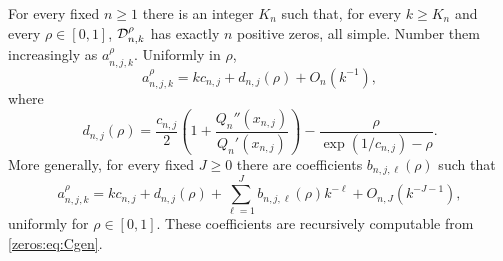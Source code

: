 \begin{theorem}\label{zeros:thm:zeroasympt}
For every fixed $n\geq1$ there is an integer $K_n$ such that, for every $k\geq K_n$ and every $\rho\in[0,1]$, $\mathcal D_{n,k}^{\rho}$ has exactly $n$ positive zeros, all simple. Number them increasingly as $a_{n,j,k}^{\rho}$. Uniformly in $\rho$,
\begin{equation}\label{zeros:eq:zero2}
 a_{n,j,k}^{\rho}=kc_{n,j}+d_{n,j}(\rho)+O_n(k^{-1}),
\end{equation}
where
\begin{equation}\label{zeros:eq:offset}
 d_{n,j}(\rho)=\frac{c_{n,j}}2
   \left(1+\frac{Q_n''(x_{n,j})}{Q_n'(x_{n,j})}\right)
       -\frac{\rho}{\exp(1/c_{n,j})-\rho}.
\end{equation}
More generally, for every fixed $J\geq0$ there are coefficients $b_{n,j,\ell}(\rho)$ such that
\begin{equation}\label{zeros:eq:zeroall}
 a_{n,j,k}^{\rho}=kc_{n,j}+d_{n,j}(\rho)
   +\sum_{\ell=1}^J b_{n,j,\ell}(\rho)k^{-\ell}
   +O_{n,J}(k^{-J-1}),
\end{equation}
uniformly for $\rho\in[0,1]$. These coefficients are recursively computable from \eqref{zeros:eq:Cgen}.
\end{theorem}
